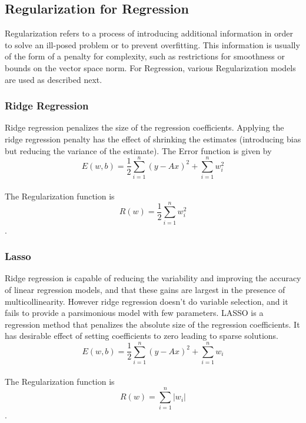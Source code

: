 \documentclass{sigplanconf}
\begin{document}
\subsection{Regularization for Regression}
Regularization refers to a process of introducing additional information in order to solve an ill-posed problem or to prevent overfitting. 
This information is usually of the form of a penalty for complexity, such as restrictions for smoothness or bounds on the vector space norm.
For Regression, various Regularization models are used as described next.

\subsubsection{Ridge Regression}
Ridge regression penalizes the size of the regression coefficients. Applying the ridge regression penalty
has the effect of shrinking the estimates (introducing bias but reducing the variance of the estimate). The Error
function is given by \\
\begin{equation} E(w,b) =\frac{1}{2} \sum_{i=1}^{n} (y-Ax)^2 + \sum_{i=1}^{n} w_i^2 \end{equation} \\
The Regularization function is
\begin{equation}R(w)=\frac{1}{2} \sum_{i=1}^{n} w_i^2\end{equation}.

\subsubsection{Lasso}
Ridge regression is capable of reducing the variability and improving the accuracy of linear regression
models, and that these gains are largest in the presence of multicollinearity. However ridge regression
doesn't do variable selection, and it fails to provide a parsimonious model with few parameters.
LASSO is a regression method that penalizes the absolute size of the regression coefficients. It has
desirable effect of setting coefficients to zero leading to sparse solutions.\\
\begin{equation} E(w,b) =\frac{1}{2} \sum_{i=1}^{n} (y-Ax)^2 + \sum_{i=1}^{n} w_i \end{equation} \\
The Regularization function is
\begin{equation}R(w)=\sum_{i=1}^{n} |w_i|\end{equation}.
\end{document}
